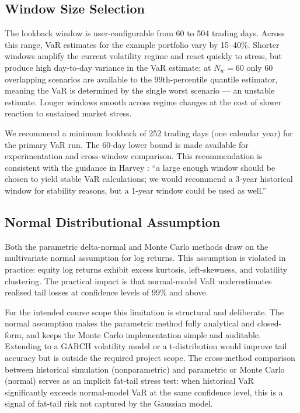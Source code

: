 \documentclass[11pt]{article}
\begin{document}
\subsection{Window Size Selection}

The lookback window is user-configurable from 60 to 504 trading days.  Across
this range, VaR estimates for the example portfolio vary by 15--40\%.  Shorter
windows amplify the current volatility regime and react quickly to stress, but
produce high day-to-day variance in the VaR estimate; at $N_w = 60$ only 60
overlapping scenarios are available to the 99th-percentile quantile estimator,
meaning the VaR is determined by the single worst scenario --- an unstable
estimate.  Longer windows smooth across regime changes at the cost of slower
reaction to sustained market stress.

We recommend a minimum lookback of 252 trading days (one calendar year) for
the primary VaR run.  The 60-day lower bound is made available for
experimentation and cross-window comparison.  This recommendation is consistent
with the guidance in Harvey \cite{stein2014muni}: ``a large enough window
should be chosen to yield stable VaR calculations; we would recommend a 3-year
historical window for stability reasons, but a 1-year window could be used as
well.''

\subsection{Normal Distributional Assumption}

Both the parametric delta-normal and Monte Carlo methods draw on the
multivariate normal assumption for log returns.  This assumption is violated in
practice: equity log returns exhibit excess kurtosis, left-skewness, and
volatility clustering.  The practical impact is that normal-model VaR
underestimates realised tail losses at confidence levels of 99\% and above.

For the intended course scope this limitation is structural and deliberate.  The
normal assumption makes the parametric method fully analytical and closed-form,
and keeps the Monte Carlo implementation simple and auditable.  Extending to a
GARCH volatility model or a t-distribution would improve tail accuracy but is
outside the required project scope.  The cross-method comparison between
historical simulation (nonparametric) and parametric or Monte Carlo (normal)
serves as an implicit fat-tail stress test: when historical VaR significantly
exceeds normal-model VaR at the same confidence level, this is a signal of
fat-tail risk not captured by the Gaussian model.
\end{document}
